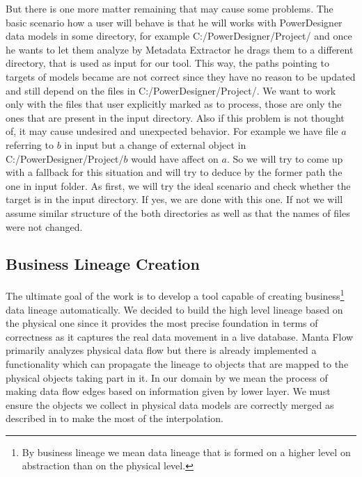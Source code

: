 But there is one more matter remaining that may cause some problems. The basic scenario how a user will behave is that he will works with PowerDesigner data models in some directory, for example C:/PowerDesigner/Project/ and once he wants to let them analyze by Metadata Extractor he drags them to a different directory, that is used as input for our tool.
This way, the paths pointing to targets of models became are not correct since they have no reason to be updated and still depend on the files in C:/PowerDesigner/Project/. We want to work only with the files that user explicitly marked as to process, those are only the ones that are present in the input directory. Also if this problem is not thought of, it may cause undesired and unexpected behavior. 
For example we have file $a$ referring to $b$ in input but a change of external object in C:/PowerDesigner/Project/$b$ would have affect on $a$.
So we will try to come up with a fallback for this situation and will try to deduce by the former path the one in input folder.
As first, we will try the ideal scenario and check whether the target is in the input directory. If yes, we are done with this one.  
If not we will assume similar structure of the both directories as well as that the names of files were not changed.

\subsection{Business Lineage Creation}
The ultimate goal of the work is to develop a tool capable of creating business\footnote{By business lineage we mean data lineage that is formed on a higher level on abstraction than on the physical level.} data lineage automatically.
We decided to build the high level lineage based on the physical one since it provides the most precise foundation in terms of correctness as it captures the real data movement in a live database.
Manta Flow primarily analyzes physical data flow but there is already implemented a functionality which can propagate the lineage to objects that are mapped to the physical objects taking part in it.
In our domain by  we mean the process of making data flow edges based on information given by lower layer.
We must ensure the objects we collect in physical data models are correctly merged as described in  to make the most of the interpolation.


